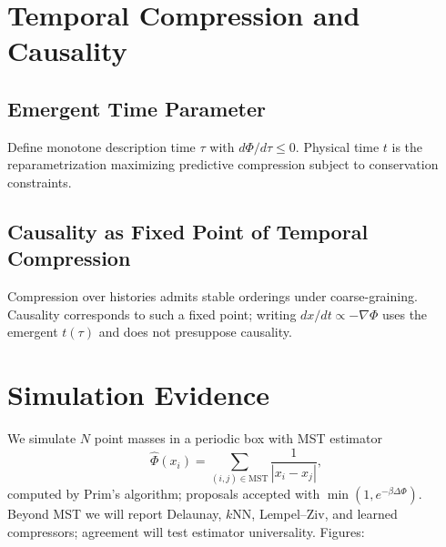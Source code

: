 \documentclass[aps,preprint,onecolumn,longbibliography,nofootinbib]{revtex4-2}
\numberwithin{equation}{section}
\begin{document}
\section{Temporal Compression and Causality}
\subsection{Emergent Time Parameter}
Define monotone description time $\tau$ with $d\Phi/d\tau\le0$. Physical time $t$ is the reparametrization maximizing predictive compression subject to conservation constraints.

\subsection{Causality as Fixed Point of Temporal Compression}
Compression over histories admits stable orderings under coarse-graining. Causality corresponds to such a fixed point; writing $dx/dt\propto-\nabla\Phi$ uses the emergent $t(\tau)$ and does not presuppose causality.

\section{Simulation Evidence}
We simulate $N$ point masses in a periodic box with MST estimator
\begin{equation}
\widehat\Phi({x_i})=\sum_{(i,j)\in\mathrm{MST}}\frac{1}{|x_i-x_j|},\label{eq:D1}
\end{equation}
computed by Prim’s algorithm; proposals accepted with $\min(1,e^{-\beta\Delta\Phi})$. Beyond MST we will report Delaunay, $k$NN, Lempel–Ziv, and learned compressors; agreement will test estimator universality. Figures:
\end{document}
